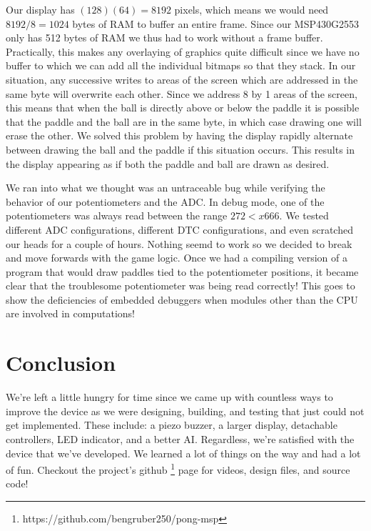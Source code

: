 \documentclass{article}
\begin{document}
Our display has $(128)(64) = 8192$ pixels, which means we would need $8192 / 8 = 1024$ bytes of RAM to buffer an entire frame. Since our MSP430G2553 only has 512 bytes of RAM we thus had to work without a frame buffer. Practically, this makes any overlaying of graphics quite difficult since we have no buffer to which we can add all the individual bitmaps so that they stack. In our situation, any successive writes
to areas of the screen which are addressed in the same byte will overwrite each other. Since we address 8 by 1 areas of the screen, this means
that when the ball is directly above or below the paddle it is possible that the paddle and the ball are in the same byte, in which case drawing
one will erase the other. We solved this problem by having the display rapidly alternate between drawing the ball and the paddle if this situation occurs. This results in the display appearing as if both the paddle and ball are drawn as desired.

We ran into what we thought was an untraceable bug while verifying the behavior of our potentiometers and the ADC. In debug mode, one of the potentiometers was always read between the range $272<x666$. We tested different ADC configurations, different DTC configurations, and even scratched our heads for a couple of hours. Nothing seemd to work so we decided to break and move forwards with the game logic. Once we had a compiling version of a program that would draw paddles tied to the potentiometer positions, it became clear that the troublesome potentiometer was being read correctly! This goes to show the deficiencies of embedded debuggers when modules other than the CPU are involved in computations!

\section{Conclusion}
 We're left a little hungry for time since we came up with countless ways to improve the device as we were designing, building, and testing that just could not get implemented. These include: a piezo buzzer, a larger display, detachable controllers, LED indicator, and a better AI. Regardless, we're satisfied with the device that we've developed. We learned a lot of things on the way and had a lot of fun.
 Checkout the project's github \footnote{https://github.com/bengruber250/pong-msp} page for videos, design files, and source code!
\end{document}
